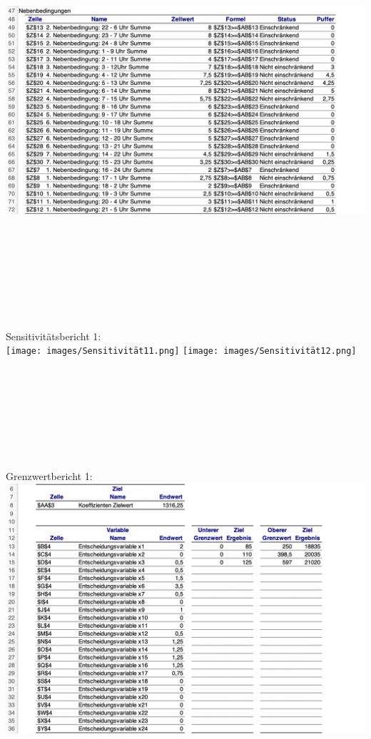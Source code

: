 \includegraphics[width=17cm,left]{images/Antwortbericht13.png}\\~\\~\\~\\~\\~\\~\\\\\\
Sensitivitätsbericht 1:\\
\texttt{[image: images/Sensitivität11.png]}
\texttt{[image: images/Sensitivität12.png]}
\\\\\\\\\\\\\\\\\\
Grenzwertbericht 1:\\
\includegraphics[width=17cm,left]{images/Grenzwert11.png}\\
